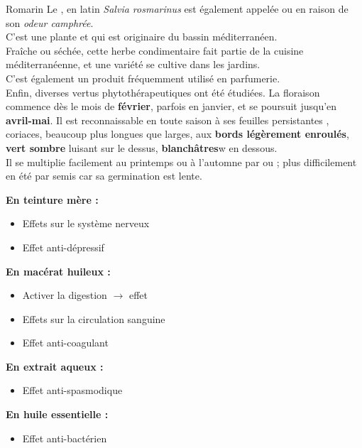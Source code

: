 \ficheidentiteplantelong
{Romarin}
{%
    Le , en latin \textit{Salvia rosmarinus} est également appelée  ou  en raison de son \textit{odeur camphrée}.\\

    C'est une plante   et  qui est originaire du bassin méditerranéen.\\
    

}
{%
Fraîche ou séchée, cette herbe condimentaire fait partie de la cuisine méditerranéenne, et une variété se cultive dans les jardins.  \\
C'est également un produit fréquemment utilisé en parfumerie. \\
Enfin, diverses vertus phytothérapeutiques ont été étudiées.
}
{%
    La floraison commence dès le mois de \textbf{février}, parfois en janvier, et se poursuit jusqu'en \textbf{avril-mai}.
    Il est reconnaissable en toute saison à ses feuilles persistantes , coriaces, beaucoup plus longues que larges, 
    aux \textbf{bords légèrement enroulés}, \textbf{vert sombre} luisant sur le dessus, \textbf{blanchâtres}w en dessous.\\

    Il se multiplie facilement au printemps ou à l'automne par  ou  ; 
    plus difficilement en été par semis car sa germination est lente.
}
{%
\textbf{En teinture mère :}
    \begin{itemize}[label = \faPen]
        \item Effets sur le système nerveux
        \item Effet anti-dépressif
    \end{itemize}
    \textbf{En macérat huileux :}
    \begin{itemize}[label = \faPen]
        \item Activer la digestion $\longrightarrow$ effet 
        \item Effets sur la circulation sanguine
        \item Effet anti-coagulant
    \end{itemize}
    \textbf{En extrait aqueux :}
    \begin{itemize}[label = \faPen]
        \item Effet anti-spasmodique
    \end{itemize}
    \textbf{En huile essentielle :}
    \begin{itemize}[label = \faPen]
        \item Effet anti-bactérien
    \end{itemize}
}
